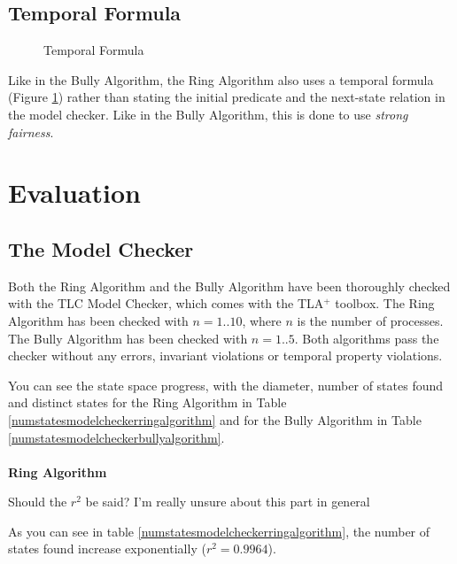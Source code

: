 \documentclass{report}
\begin{document}
\section{Temporal Formula}

\begin{figure}
  \tlatex
\@x{}\moduleLeftDash{}\moduleRightDash\@xx{}%
\@x{}\bottombar\@xx{}%
  \caption{Temporal Formula}
  \label{ringtemporalformula}
  \end{figure}

Like in the Bully Algorithm, the Ring Algorithm also uses a temporal formula (Figure \ref{ringtemporalformula}) rather than stating the initial predicate and the next-state relation in the model checker. Like in the Bully Algorithm, this is done to use \textit{strong fairness}.

\chapter{Evaluation}
\section{The Model Checker}
Both the Ring Algorithm and the Bully Algorithm have been thoroughly checked with the TLC Model Checker, which comes with the TLA$^{+}$ toolbox. The Ring Algorithm has been checked with $n = 1..10$, where $n$ is the number of processes. The Bully Algorithm has been checked with $n = 1..5$. Both algorithms pass the checker without any errors, invariant violations or temporal property violations.

You can see the state space progress, with the diameter, number of states found and distinct states for the Ring Algorithm in Table \ref{numstatesmodelcheckerringalgorithm} and for the Bully Algorithm in Table \ref{numstatesmodelcheckerbullyalgorithm}.
\\\\
\noindent
\textbf{Ring Algorithm}\\
\noindent
\begin{calloutyellow}
  Should the $r^{2}$ be said? I'm really unsure about this part in general
  \end{calloutyellow}
As you can see in table \ref{numstatesmodelcheckerringalgorithm}, the number of states found increase exponentially ($r^{2} = 0.9964$).
\end{document}

